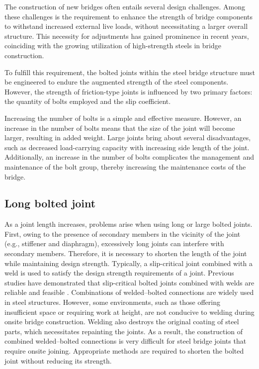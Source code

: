 The construction of new bridges often entails several design challenges. Among these challenges is the requirement to enhance the strength of bridge components to withstand increased external live loads, without necessitating a larger overall structure. This necessity for adjustments has gained prominence in recent years, coinciding with the growing utilization of high-strength steels in bridge construction.

To fulfill this requirement, the bolted joints within the steel bridge structure must be engineered to endure the augmented strength of the steel components. However, the strength of friction-type joints is influenced by two primary factors: the quantity of bolts employed and the slip coefficient. 

Increasing the number of bolts is a simple and effective measure. However, an increase in the number of bolts means that the size of the joint will become larger, resulting in added weight. Large joints bring about several disadvantages, such as decreased load-carrying capacity with increasing side length of the joint. Additionally, an increase in the number of bolts complicates the management and maintenance of the bolt group, thereby increasing the maintenance costs of the bridge.

\subsection{Long bolted joint}
As a joint length increases, problems arise when using  long or large bolted joints. First, owing to the presence of secondary members in the vicinity of the joint (e.g., stiffener and diaphragm), excessively long joints can interfere with secondary members. Therefore, it is necessary to shorten the length of the joint while maintaining design strength. Typically, a slip-critical joint combined with a weld is used to satisfy the design strength requirements of a joint. Previous studies have demonstrated that slip-critical bolted joints combined with welds are reliable and feasible \cite{solodov2021,Thomas2000,Chang2019361,KHANDEL2022107036}. Combinations of welded--bolted connections are widely used in steel structures. However, some environments, such as those offering insufficient space or requiring work at height, are not conducive to welding during onsite bridge construction. Welding also destroys the original coating of steel parts, which necessitates repainting the joints. As a result, the construction of combined welded--bolted connections is very difficult for steel bridge joints that require onsite joining. Appropriate methods are required to shorten the bolted joint without reducing its strength. \par

